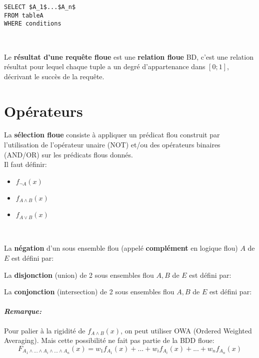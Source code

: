 \documentclass[a4paper,11pt]{article}
\begin{document}
\begin{lstlisting}[mathescape]
SELECT $A_1$...$A_n$
FROM tableA
WHERE conditions
\end{lstlisting}
~

Le \textbf{résultat d'une requête floue} est une \textbf{relation floue} BD, c'est une relation résultat pour lequel chaque tuple a un degré d'appartenance dans $[0;1]$, décrivant le succès de la requête.

\section{Opérateurs}
La \textbf{sélection floue} consiste à appliquer un prédicat flou construit par l’utilisation de l'opérateur unaire (NOT) et/ou des opérateurs binaires (AND/OR) sur les prédicats flous donnés.\\

Il faut définir:
\begin{itemize}
	\item$f_{\lnot A}(x)$	
	\item$f_{A\land B}(x)$
	\item$f_{A\lor B}(x)$
\end{itemize} 
~

La \textbf{négation} d'un sous ensemble flou (appelé \textbf{complément} en logique flou) $A$ de $E$ est défini par: \begin{center}  \end{center}

La \textbf{disjonction} (union) de 2 sous ensembles flou $A,B$ de $E$ est défini par: \begin{center}  \end{center}

La \textbf{conjonction} (intersection) de 2 sous ensembles flou $A,B$ de $E$ est défini par: \begin{center}  \end{center}

\paragraph{\emph{Remarque:}}
Pour palier à la rigidité de $f_{A\land B}(x)$, on peut utiliser OWA (Ordered Weighted Averaging). Mais cette possibilité ne fait pas partie de la BDD floue:
$$ F_{A_1\land...\land A_i\land ...\land A_n}(x)=w_1f_{A_1}(x)+...+w_if_{A_i}(x)+...+w_nf_{A_n}(x)$$
\\
\end{document}

